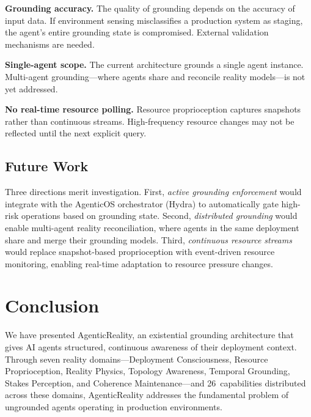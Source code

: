 \documentclass[10pt, twocolumn]{article}
\begin{document}
\textbf{Grounding accuracy.} The quality of grounding depends on the accuracy of input data. If environment sensing misclassifies a production system as staging, the agent's entire grounding state is compromised. External validation mechanisms are needed.

\textbf{Single-agent scope.} The current architecture grounds a single agent instance. Multi-agent grounding---where agents share and reconcile reality models---is not yet addressed.

\textbf{No real-time resource polling.} Resource proprioception captures snapshots rather than continuous streams. High-frequency resource changes may not be reflected until the next explicit query.

\subsection{Future Work}
\label{sec:future}

Three directions merit investigation. First, \emph{active grounding enforcement} would integrate with the AgenticOS orchestrator (Hydra) to automatically gate high-risk operations based on grounding state. Second, \emph{distributed grounding} would enable multi-agent reality reconciliation, where agents in the same deployment share and merge their grounding models. Third, \emph{continuous resource streams} would replace snapshot-based proprioception with event-driven resource monitoring, enabling real-time adaptation to resource pressure changes.


\section{Conclusion}
\label{sec:conclusion}

We have presented AgenticReality, an existential grounding architecture that gives AI agents structured, continuous awareness of their deployment context. Through seven reality domains---Deployment Consciousness, Resource Proprioception, Reality Physics, Topology Awareness, Temporal Grounding, Stakes Perception, and Coherence Maintenance---and 26~capabilities distributed across these domains, AgenticReality addresses the fundamental problem of ungrounded agents operating in production environments.
\end{document}
